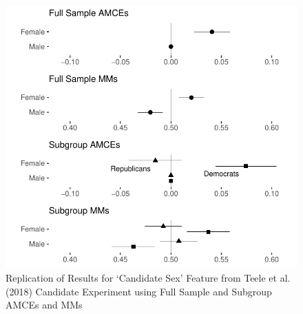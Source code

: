 \documentclass[a4paper,12pt]{article}\usepackage[]{graphicx}\usepackage[]{color}
\makeatletter
\def\maxwidth{ %
  \ifdim\Gin@nat@width>\linewidth
    \linewidth
  \else
    \Gin@nat@width
  \fi
}
\newenvironment{knitrout}{}{} %
\makeatother
\begin{document}
\begin{knitrout}
\color{fgcolor}\begin{figure}
\includegraphics[width=\maxwidth]{figure/tkr_replication-1} \caption[Replication of Results for `Candidate Sex' Feature from Teele et al]{Replication of Results for `Candidate Sex' Feature from Teele et al. (2018) Candidate Experiment using Full Sample and Subgroup AMCEs and MMs}\label{fig:tkr_replication}
\end{figure}


\end{knitrout}
\end{document}
